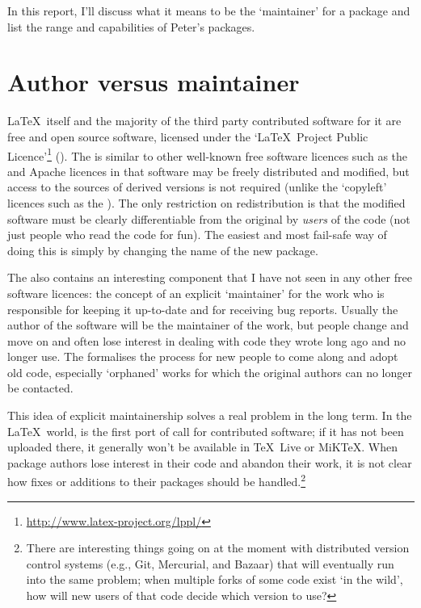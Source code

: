 \documentclass[final]{ltugboat}
\begin{document}
In this report, I'll discuss what it means to be the `maintainer' for a package and list the range and capabilities of Peter's packages.

\section{Author versus maintainer}

\LaTeX\ itself and the majority of the third party contributed software for it are free and open source software, licensed under the `\LaTeX\ Project Public Licence'\footnote{\url{http://www.latex-project.org/lppl/}} (). The  is similar to other well-known free software licences such as the  and Apache licences in that software may be freely distributed and modified, but access to the sources of derived versions is not required (unlike the `copyleft' licences such as the ). The only restriction on redistribution is that the modified software must be clearly differentiable from the original by \emph{users} of the code (not just people who read the code for fun). The easiest and most fail-safe way of doing this is simply by changing the name of the new package.

The  also contains an interesting component that I have not seen in any other free software licences: the concept of an explicit `maintainer' for the work who is responsible for keeping it up-to-date and for receiving bug reports. Usually the author of the software will be the maintainer of the work, but people change and move on and often lose interest in dealing with code they wrote long ago and no longer use. The  formalises the process for new people to come along and adopt old code, especially `orphaned' works for which the original authors can no longer be contacted.

This idea of explicit maintainership solves a real problem in the long term. In the \LaTeX\ world,  is the first port of call for contributed software; if it has not been uploaded there, it generally won't be available in \TeX\ Live or MiK\TeX. When package authors lose interest in their code and abandon their work, it is not clear how fixes or additions to their packages should be handled.\footnote{There are interesting things going on at the moment with distributed version control systems (e.g., Git, Mercurial, and Bazaar) that will eventually run into the same problem; when multiple forks of some code exist `in the wild', how will new users of that code decide which version to use?}
\end{document}
